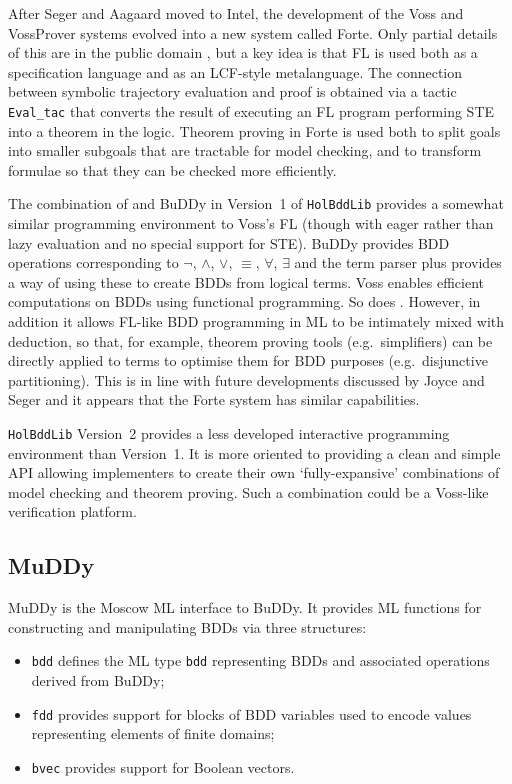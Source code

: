 \documentclass[12pt]{book}
\renewcommand{\t}[1]{\mbox{\tt #1}}
\newcommand{\Buddy}{BuDDy{}}
\newcommand{\Muddy}{MuDDy{}}
\begin{document}
After Seger and Aagaard moved to Intel, the development of the Voss and
VossProver systems evolved into a new system called Forte.  Only partial details
of this are in the public domain
\cite{oleary-itj-99,aagaard-tphols-99}, but a key idea is that FL is
used both as a specification language and as an LCF-style
metalanguage. The connection between symbolic trajectory evaluation
and proof is obtained via a tactic {\tt{Eval\_tac}} that converts the
result of executing an FL program performing STE into a theorem in the
logic. Theorem proving in Forte is used both to split goals into
smaller subgoals that are tractable for model checking, and to
transform formulae so that they can be checked more efficiently.

The combination of \HOL{} and \Buddy{} in Version~1 of
{\tt{HolBddLib}} provides a somewhat similar programming environment
to Voss's FL (though with eager rather than lazy evaluation and no
special support for STE). \Buddy{} provides BDD operations
corresponding to $\neg$, $\wedge$, $\vee$, $\equiv$, $\forall$,
$\exists$ and the \HOL{} term parser plus  provides a
way of using these to create BDDs from logical terms.  Voss enables
efficient computations on BDDs using functional programming. So does
. However, in addition it allows FL-like BDD programming
in ML to be intimately mixed with \HOL{} deduction, so that, for
example, theorem proving tools (e.g.~simplifiers) can be directly
applied to terms to optimise them for BDD purposes (e.g.~disjunctive
partitioning).  This is in line with future developments discussed by
Joyce and Seger \cite{JoyceSeger} and it appears that the Forte system
has similar capabilities.

{\tt{HolBddLib}} Version~2 provides a less developed interactive
programming environment than Version~1. It is more oriented to
providing a clean and simple API allowing implementers to create their
own `fully-expansive' combinations of model checking and theorem
proving. Such a combination could be a Voss-like verification
platform.



\subsection{\Muddy}\label{muddy}

\Muddy{} is the Moscow ML interface to \Buddy{}. It provides ML functions for constructing and
manipulating BDDs via three structures:

\begin{itemize}

\item \t{bdd} defines the ML type
\t{bdd} representing BDDs and associated operations derived from \Buddy{};


\item \t{fdd} provides support for blocks of BDD variables
used to encode values representing elements of finite domains;

\item \t{bvec} provides support for Boolean vectors.

\end{itemize}
\end{document}
